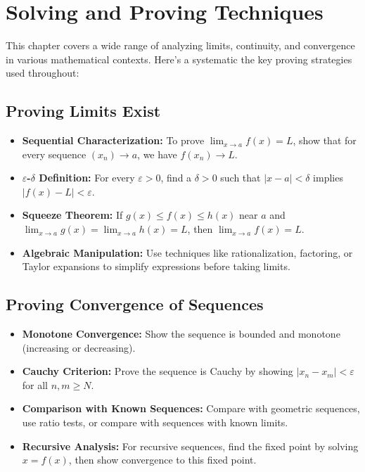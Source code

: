 \section{Solving and Proving Techniques}

This chapter covers a wide range of analyzing limits, continuity, and convergence in various mathematical contexts. Here's a systematic the key proving strategies used throughout:

\subsection*{Proving Limits Exist}

\begin{itemize}
\item \textbf{Sequential Characterization:} To prove $\lim_{x \to a} f(x) = L$, show that for every sequence $(x_n) \to a$, we have $f(x_n) \to L$.

\item \textbf{$\varepsilon$-$\delta$ Definition:} For every $\varepsilon > 0$, find a $\delta > 0$ such that $|x - a| < \delta$ implies $|f(x) - L| < \varepsilon$.

\item \textbf{Squeeze Theorem:} If $g(x) \leq f(x) \leq h(x)$ near $a$ and $\lim_{x \to a} g(x) = \lim_{x \to a} h(x) = L$, then $\lim_{x \to a} f(x) = L$.

\item \textbf{Algebraic Manipulation:} Use techniques like rationalization, factoring, or Taylor expansions to simplify expressions before taking limits.
\end{itemize}

\subsection*{Proving Convergence of Sequences}

\begin{itemize}
\item \textbf{Monotone Convergence:} Show the sequence is bounded and monotone (increasing or decreasing).

\item \textbf{Cauchy Criterion:} Prove the sequence is Cauchy by showing $|x_n - x_m| < \varepsilon$ for all $n, m \geq N$.

\item \textbf{Comparison with Known Sequences:} Compare with geometric sequences, use ratio tests, or compare with sequences with known limits.

\item \textbf{Recursive Analysis:} For recursive sequences, find the fixed point by solving $x = f(x)$, then show convergence to this fixed point.
\end{itemize}

